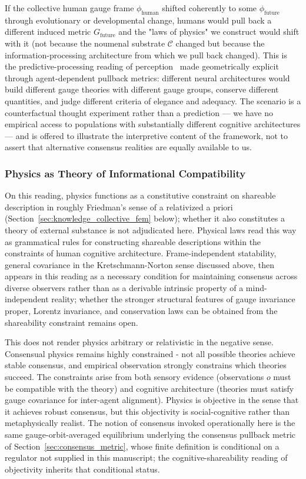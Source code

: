 \documentclass[11pt]{article}
\begin{document}
If the collective human gauge frame $\phi_{\text{human}}$ shifted coherently to some $\phi_{\text{future}}$ through evolutionary or developmental change, humans would pull back a different induced metric $G_{\text{future}}$ and the "laws of physics" we construct would shift with it (not because the noumenal substrate $\mathcal{C}$ changed but because the information-processing architecture from which we pull back changed). This is the predictive-processing reading of perception~\cite{Clark2016, Seth2021, Hoffman2019, hohwy2013predictive} made geometrically explicit through agent-dependent pullback metrics: different neural architectures would build different gauge theories with different gauge groups, conserve different quantities, and judge different criteria of elegance and adequacy. The scenario is a counterfactual thought experiment rather than a prediction — we have no empirical access to populations with substantially different cognitive architectures — and is offered to illustrate the interpretive content of the framework, not to assert that alternative consensus realities are equally available to us.

\subsubsection{Physics as Theory of Informational Compatibility}

On this reading, physics functions as a constitutive constraint on shareable description in roughly Friedman's sense of a relativized a priori~\cite{Friedman2001} (Section~\ref{sec:knowledge_collective_fem} below); whether it also constitutes a theory of external substance is not adjudicated here. Physical laws read this way as grammatical rules for constructing shareable descriptions within the constraints of human cognitive architecture. Frame-independent statability, general covariance in the Kretschmann-Norton sense discussed above, then appears in this reading as a necessary condition for maintaining consensus across diverse observers rather than as a derivable intrinsic property of a mind-independent reality; whether the stronger structural features of gauge invariance proper, Lorentz invariance, and conservation laws can be obtained from the shareability constraint remains open.

This does not render physics arbitrary or relativistic in the negative sense. Consensual physics remains highly constrained - not all possible theories achieve stable consensus, and empirical observation strongly constrains which theories succeed. The constraints arise from both sensory evidence (observations $o$ must be compatible with the theory) and cognitive architecture (theories must satisfy gauge covariance for inter-agent alignment). Physics is objective in the sense that it achieves robust consensus, but this objectivity is social-cognitive rather than metaphysically realist. The notion of consensus invoked operationally here is the same gauge-orbit-averaged equilibrium underlying the consensus pullback metric of Section~\ref{sec:consensus_metric}, whose finite definition is conditional on a regulator not supplied in this manuscript; the cognitive-shareability reading of objectivity inherits that conditional status.
\end{document}
